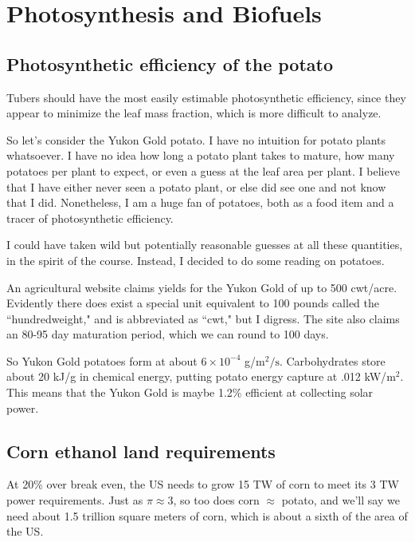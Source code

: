 \documentclass[12pt]{article}
\begin{document}
\section{Photosynthesis and Biofuels}

\subsection{Photosynthetic efficiency of the potato}

Tubers should have the most easily estimable photosynthetic efficiency, since they appear to minimize the leaf mass fraction, which is more difficult to analyze.

So let's consider the Yukon Gold potato. I have no intuition for potato plants whatsoever. I have no idea how long a potato plant takes to mature, how many potatoes per plant to expect, or even a guess at the leaf area per plant. I believe that I have either never seen a potato plant, or else did see one and not know that I did. Nonetheless, I am a huge fan of potatoes, both as a food item and a tracer of photosynthetic efficiency.

I could have taken wild but potentially reasonable guesses at all these quantities, in the spirit of the course. Instead, I decided to do some reading on potatoes.

An agricultural website claims yields for the Yukon Gold of up to 500 cwt/acre. Evidently there does exist a special unit equivalent to 100 pounds called the ``hundredweight," and is abbreviated as ``cwt," but I digress. The site also claims an 80-95 day maturation period, which we can round to 100 days.

So Yukon Gold potatoes form at about \(6 \times 10^{-4}\) g/\(\mathrm{m}^2/\mathrm{s}\). Carbohydrates store about 20 kJ/g in chemical energy, putting potato energy capture at .012 kW/\(\mathrm{m}^2\). This means that the Yukon Gold is maybe 1.2\% efficient at collecting solar power.

\subsection{Corn ethanol land requirements}

At 20\% over break even, the US needs to grow 15 TW of corn to meet its 3 TW power requirements. Just as \(\pi \approx 3\), so too does corn \(\approx\) potato, and we'll say we need about 1.5 trillion square meters of corn, which is about a sixth of the area of the US.
\end{document}
